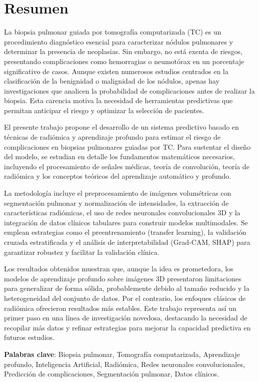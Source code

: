 %

\chapter{Resumen}

La biopsia pulmonar guiada por tomografía computarizada (TC) es un procedimiento diagnóstico esencial para caracterizar nódulos pulmonares y determinar la presencia de neoplasias. Sin embargo, no está exenta de riesgos, presentando complicaciones como hemorragias o neumotórax en un porcentaje significativo de casos. Aunque existen numerosos estudios centrados en la clasificación de la benignidad o malignidad de los nódulos, apenas hay investigaciones que analicen la probabilidad de complicaciones antes de realizar la biopsia. Esta carencia motiva la necesidad de herramientas predictivas que permitan anticipar el riesgo y optimizar la selección de pacientes.

El presente trabajo propone el desarrollo de un sistema predictivo basado en técnicas de radiómica y aprendizaje profundo para estimar el riesgo de complicaciones en biopsias pulmonares guiadas por TC. Para sustentar el diseño del modelo, se estudian en detalle los fundamentos matemáticos necesarios, incluyendo el procesamiento de señales médicas, teoría de convolución, teoría de radiómica y los conceptos teóricos del aprendizaje automático y profundo. 

La metodología incluye el preprocesamiento de imágenes volumétricas con segmentación pulmonar y normalización de intensidades, la extracción de características radiómicas, el uso de redes neuronales convolucionales 3D y la integración de datos clínicos tabulares para construir modelos multimodales. Se emplean estrategias como el preentrenamiento (transfer learning), la validación cruzada estratificada y el análisis de interpretabilidad (Grad-CAM, SHAP) para garantizar robustez y facilitar la validación clínica.

Los resultados obtenidos muestran que, aunque la idea es prometedora, los modelos de aprendizaje profundo sobre imágenes 3D presentaron limitaciones para generalizar de forma sólida, probablemente debido al tamaño reducido y la heterogeneidad del conjunto de datos. Por el contrario, los enfoques clásicos de radiómica ofrecieron resultados más estables. Este trabajo representa así un primer paso en una línea de investigación novedosa, destacando la necesidad de recopilar más datos y refinar estrategias para mejorar la capacidad predictiva en futuros estudios.

\textbf{Palabras clave}: Biopsia pulmonar, Tomografía computarizada, Aprendizaje profundo, Inteligencia Artificial, Radiómica, Redes neuronales convolucionales, Predicción de complicaciones, Segmentación pulmonar, Datos clínicos.

\endinput
